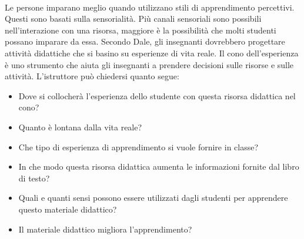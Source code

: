 \\
Le persone imparano meglio quando utilizzano stili di apprendimento percettivi. Questi sono basati sulla sensorialità. Più canali sensoriali sono possibili nell'interazione con una risorsa, maggiore è la possibilità che molti studenti possano imparare da essa. Secondo Dale, gli insegnanti dovrebbero progettare attività didattiche che si basino su esperienze di vita reale.
Il cono dell'esperienza è uno strumento che aiuta gli insegnanti a prendere decisioni sulle risorse e sulle attività. L'istruttore può chiedersi quanto segue:
\begin{itemize}
  \item Dove si collocherà l'esperienza dello studente con questa risorsa didattica nel cono?
  \item Quanto è lontana dalla vita reale?
  \item Che tipo di esperienza di apprendimento si vuole fornire in classe?
  \item In che modo questa risorsa didattica aumenta le informazioni fornite dal libro di testo?
  \item Quali e quanti sensi possono essere utilizzati dagli studenti per apprendere questo materiale didattico?
  \item Il materiale didattico migliora l'apprendimento?
\end{itemize}
